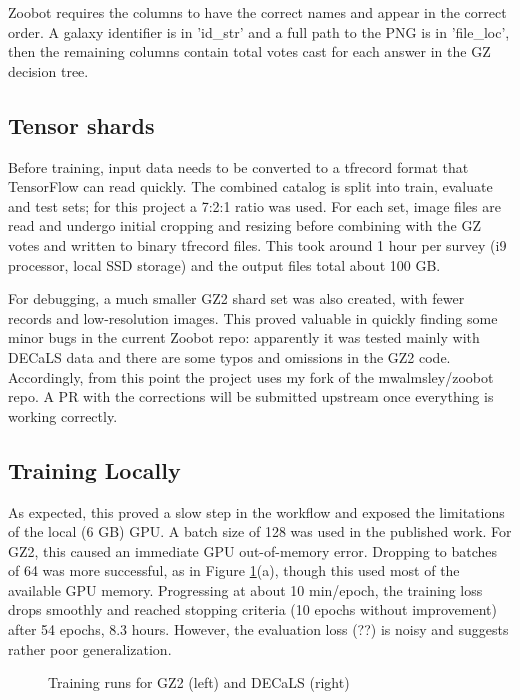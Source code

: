 \documentclass[preprint]{aastex631}
\newcommand{\todo}{\color{red}{TODO}\color{black}\hspace{2mm}}
\begin{document}
Zoobot requires the columns to have the correct names and appear in the correct order. A galaxy identifier is in 'id\_str' and a full path to the PNG is in 'file\_loc', then the remaining columns contain total votes cast for each answer in the GZ decision tree.

\subsection{Tensor shards}

Before training, input data needs to be converted to a tfrecord format that TensorFlow can read quickly. The combined catalog is split into train, evaluate and test sets; for this project a 7:2:1 ratio was used. For each set, image files are read and undergo initial cropping and resizing before combining with the GZ votes and written to binary tfrecord files. This took around 1 hour per survey (i9 processor, local SSD storage) and the output files total about 100 GB.

For debugging, a much smaller GZ2 shard set was also created, with fewer records and low-resolution images. This proved valuable in quickly finding some minor bugs in the current Zoobot repo: apparently it was tested mainly with DECaLS data and there are some typos and omissions in the GZ2 code. Accordingly, from this point the project uses my fork of the mwalmsley/zoobot repo. A PR with the corrections will be submitted upstream once everything is working correctly.

\subsection{Training Locally}

As expected, this proved a slow step in the workflow and exposed the limitations of the local (6 GB) GPU. A batch size of 128 was used in the published work. For GZ2, this caused an immediate GPU out-of-memory error. Dropping to batches of 64 was more successful, as in Figure \ref{fig:train_plots}(a), though this used most of the available GPU memory. Progressing at about 10 min/epoch, the training loss drops smoothly and reached stopping criteria (10 epochs without improvement) after 54 epochs, 8.3 hours. However, the evaluation loss (\todo ??) is noisy and suggests rather poor generalization.


\begin{figure}
	\caption{Training runs for GZ2 (left) and DECaLS (right) \label{fig:train_plots}}
\end{figure}
\end{document}
